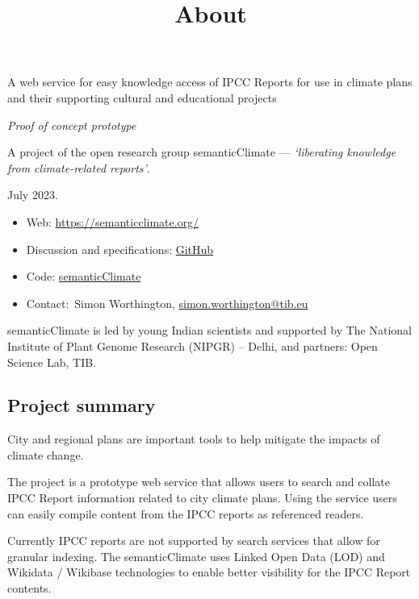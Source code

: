 \documentclass{article}
\begin{document}
\title{About}

\maketitle


A web service for easy knowledge access of IPCC Reports for use in climate plans and their supporting cultural and educational projects


\emph{Proof of concept prototype}


A project of the open research group semanticClimate — \emph{‘liberating knowledge from climate-related reports’}.


July 2023. 

\begin{itemize}
\item Web: \href{https://semanticclimate.org/}{https://semanticclimate.org/} 


\item Discussion and specifications: \href{https://github.com/petermr/semanticClimate/discussions/32}{GitHub} 


\item Code: \href{https://github.com/petermr/semanticClimate}{semanticClimate} 


\item Contact: Simon Worthington, \href{mailto:simon.worthington@tib.eu}{simon.worthington@tib.eu} 


\end{itemize}

semanticClimate is led by young Indian scientists and supported by The National Institute of Plant Genome Research (NIPGR) – Delhi, and partners: Open Science Lab, TIB.


\subsection{Project summary}\label{H2966887}



City and regional plans are important tools to help mitigate the impacts of climate change. 


The project is a prototype web service that allows users to search and collate IPCC Report information related to city climate plans. Using the service users can easily compile content from the IPCC reports as referenced readers.


Currently IPCC reports are not supported by search services that allow for granular indexing. The semanticClimate uses Linked Open Data (LOD) and Wikidata / Wikibase technologies to enable better visibility for the IPCC Report contents.
\end{document}
